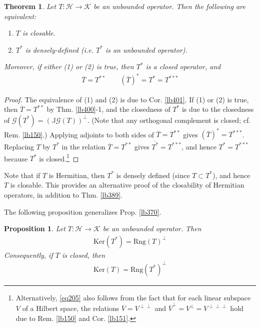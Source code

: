 \documentclass[12pt,b5paper,notitlepage]{article}
\theoremstyle{definition}
\theoremstyle{plain}
\newtheorem{thm}[df]{Theorem}
\newtheorem{pp}[df]{Proposition}
\newcommand{\ovl}{\overline}
\newcommand{\Jbb}{\mathbb J}
\newcommand{\Ker}{\mathrm{Ker}}
\newcommand{\Rng}{\mathrm{Rng}}
\newcommand{\MH}{\mathcal H}
\newcommand{\MK}{\mathcal K}
\newcommand{\SG}{\mathscr G}
\numberwithin{equation}{section}
\begin{document}
\begin{thm}\label{lb402}
Let $T:\MH\rightarrow\MK$ be an unbounded operator. Then the following are equivalent:
\begin{enumerate}
\item[(1)] $T$ is closable.
\item[(2)] $T^*$ is densely-defined (i.e. $T^*$ is an unbounded operator).
\end{enumerate}
Moreover, if either (1) or (2) is true, then $T^*$ is a closed operator, and 
\begin{align}\label{eq205}
\ovl T=T^{**}\qquad (\ovl T)^*=T^*=T^{***}
\end{align}
\end{thm}



\begin{proof}
The equivalence of (1) and (2) is due to Cor. \ref{lb401}. If (1) or (2) is true, then $\ovl T=T^{**}$ by Thm. \ref{lb400}-1, and the closedness of $T^*$ is due to the closedness of $\SG(T^*)=(\Jbb\SG(T))^\perp$. (Note that any orthogonal complement is closed; cf. Rem. \ref{lb150}.) Applying adjoints to both sides of $\ovl T=T^{**}$ gives $(\ovl T)^*=T^{***}$. Replacing $T$ by $T^*$ in the relation $\ovl T=T^{**}$ gives $\ovl{T^*}=T^{***}$, and hence $T^*=T^{***}$ because $T^*$ is closed.\footnote{Alternatively, \eqref{eq205} also follows from the fact that for each linear subspace $V$ of a Hilbert space, the relations $\ovl V=V^{\perp\perp}$ and $\ovl V^\perp=V^\perp=V^{\perp\perp\perp}$ hold due to Rem. \ref{lb150} and Cor. \ref{lb151}.}
\end{proof}


Note that if $T$ is Hermitian, then $T^*$ is densely defined (since $T\subset T^*$), and hence $T$ is closable. This provides an alternative proof of the closability of Hermitian operators, in addition to Thm. \ref{lb389}.



The following proposition generalizes Prop. \ref{lb370}.


\begin{pp}\label{lb403}
Let $T:\MH\rightarrow\MK$ be an unbounded operator. Then
\begin{align}\label{eq243}
\Ker(T^*)=\Rng(T)^\perp
\end{align}
Consequently, if $T$ is closed, then
\begin{align}
\Ker(T)=\Rng(T^*)^\perp
\end{align}
\end{pp}
\end{document}
